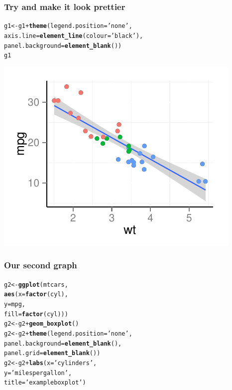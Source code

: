 \documentclass{beamer}\usepackage{graphicx, color}
\makeatletter
\def\maxwidth{ %
  \ifdim\Gin@nat@width>\linewidth
    \linewidth
  \else
    \Gin@nat@width
  \fi
}
\newcommand{\hlfunctioncall}[1]{\textcolor[rgb]{0.501960784313725,0,0.329411764705882}{\textbf{#1}}}%
\newcommand{\hlstring}[1]{\textcolor[rgb]{0.6,0.6,1}{#1}}%
\newenvironment{kframe}{%
 \def\at@end@of@kframe{}%
 \ifinner\ifhmode%
  \def\at@end@of@kframe{\end{minipage}}%
  \begin{minipage}{\columnwidth}%
 \fi\fi%
 \def\FrameCommand##1{\hskip\@totalleftmargin \hskip-\fboxsep
 \colorbox{shadecolor}{##1}\hskip-\fboxsep
     \hskip-\linewidth \hskip-\@totalleftmargin \hskip\columnwidth}%
 \MakeFramed {\advance\hsize-\width
   \@totalleftmargin\z@ \linewidth\hsize
   \@setminipage}}%
 {\par\unskip\endMakeFramed%
 \at@end@of@kframe}
\newenvironment{knitrout}{}{} %
\makeatother
\begin{document}
\begin{frame}[fragile]
  \frametitle{Try and make it look prettier}
\begin{knitrout}\scriptsize
{}\color{fgcolor}\begin{kframe}
\begin{alltt}
g1 <- g1 + \hlfunctioncall{theme}(legend.position = \hlstring{'none'},
                 axis.line = \hlfunctioncall{element_line}(colour = \hlstring{'black'}),
                 panel.background = \hlfunctioncall{element_blank}())
g1
\end{alltt}
\end{kframe}
\includegraphics[width=\maxwidth]{figure/first-line} 

\end{knitrout}

\end{frame}

\begin{frame}[fragile]
  \frametitle{Our second graph}
\begin{knitrout}
\color{fgcolor}\begin{kframe}
\begin{alltt}
g2 <- \hlfunctioncall{ggplot}(mtcars, 
             \hlfunctioncall{aes}(x = \hlfunctioncall{factor}(cyl), 
                 y = mpg, 
                 fill = \hlfunctioncall{factor}(cyl)))
g2 <- g2 + \hlfunctioncall{geom_boxplot}()
g2 <- g2 + \hlfunctioncall{theme}(legend.position = \hlstring{'none'},
                 panel.background = \hlfunctioncall{element_blank}(),
                 panel.grid = \hlfunctioncall{element_blank}())
g2 <- g2 + \hlfunctioncall{labs}(x = \hlstring{'cylinders'}, 
                y = \hlstring{'miles per gallon'},
                title = \hlstring{'example box plot'})
\end{alltt}
\end{kframe}
\end{knitrout}


\end{frame}
\end{document}
